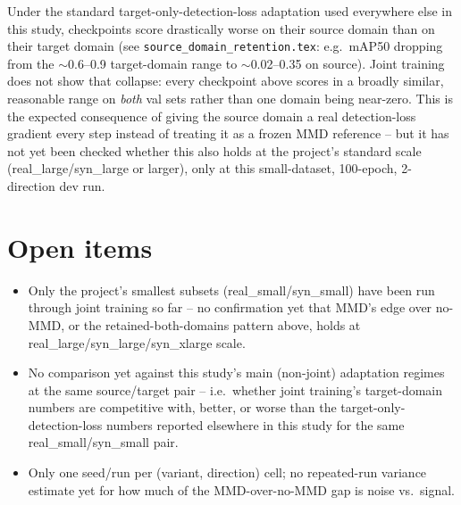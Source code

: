 \documentclass[11pt]{article}
\begin{document}
Under the standard target-only-detection-loss adaptation used everywhere else in this
study, checkpoints score drastically worse on their source domain than on their
target domain (see \texttt{source\_domain\_retention.tex}: e.g.\ mAP50 dropping from the
$\sim$0.6--0.9 target-domain range to $\sim$0.02--0.35 on source). Joint training does
not show that collapse: every checkpoint above scores in a broadly similar,
reasonable range on \emph{both} val sets rather than one domain being near-zero. This is
the expected consequence of giving the source domain a real detection-loss gradient
every step instead of treating it as a frozen MMD reference -- but it has not yet been
checked whether this also holds at the project's standard scale (real\_large/syn\_large
or larger), only at this small-dataset, 100-epoch, 2-direction dev run.

\section{Open items}

\begin{itemize}
    \item Only the project's smallest subsets (real\_small/syn\_small) have been run
    through joint training so far -- no confirmation yet that MMD's edge over no-MMD, or
    the retained-both-domains pattern above, holds at real\_large/syn\_large/syn\_xlarge
    scale.
    \item No comparison yet against this study's main (non-joint) adaptation regimes at
    the same source/target pair -- i.e.\ whether joint training's target-domain numbers
    are competitive with, better, or worse than the target-only-detection-loss numbers
    reported elsewhere in this study for the same real\_small/syn\_small pair.
    \item Only one seed/run per (variant, direction) cell; no repeated-run variance
    estimate yet for how much of the MMD-over-no-MMD gap is noise vs.\ signal.
\end{itemize}
\end{document}
